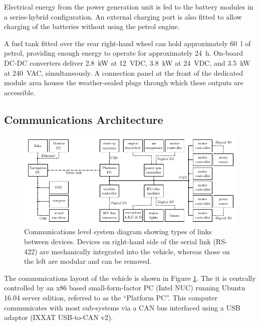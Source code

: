 \documentclass[preprint,authoryear,12pt]{elsarticle}
\begin{document}
        Electrical energy from the power generation unit is fed to the battery modules in a series-hybrid configuration.
        An external charging port is also fitted to allow charging of the batteries without using the petrol engine.

        A fuel tank fitted over the rear right-hand wheel can hold approximately \SI{60}{\litre} of petrol, providing enough energy to operate for approximately \SI{24}{\hour}.
        On-board DC-DC converters deliver \SI{2.8}{\kilo\watt} at \SI{12}{\volt}DC, \SI{3.8}{\kilo\watt} at \SI{24}{\volt}DC, and \SI{3.5}{\kilo\watt} at \SI{240}{\volt}AC, simultaneously.
        A connection panel at the front of the dedicated module area houses the weather-sealed plugs through which these outputs are accessible.


    \subsection{Communications Architecture}
    \label{sect:architecture}

        \begin{figure}[htb]
            \centering
            \includegraphics[width=\linewidth]{imgs/system_diagram/diagram_v5.pdf}
            \caption{
                Communications level system diagram showing types of links between devices.
                Devices on right-hand side of the serial link (RS-422) are mechanically integrated into the vehicle, whereas those on the left are modular and can be removed.
            }
            \label{fig:system_diagram}
        \end{figure}

        The communications layout of the vehicle is shown in Figure \ref{fig:system_diagram}.
        The it is centrally controlled by an x86 based small-form-factor PC (Intel NUC) running Ubuntu 16.04 server edition, referred to as the ``Platform PC''.
        This computer communicates with most sub-systems via a CAN bus interfaced using a USB adaptor (IXXAT USB-to-CAN v2).
\end{document}
